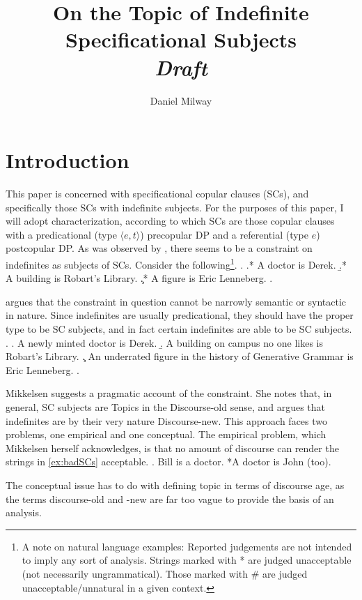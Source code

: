 \documentclass[letterpaper]{article}
\title{On the Topic of Indefinite Specificational Subjects\\\textit{Draft}}
\author{Daniel Milway}
\begin{document}
\maketitle
\section{Introduction}
This paper is concerned with specificational copular clauses (SCs), and specifically those SCs with indefinite subjects.
For the purposes of this paper, I will adopt  characterization, according to which SCs are those copular clauses with a predicational (type $\langle e,t\rangle$) precopular DP and a referential (type $e$) postcopular DP.
As was observed by \textcite{higgins1973pseudo}, there  seems to be a constraint on indefinites as subjects of SCs.
Consider the following\footnote{
	A note on natural language examples:
	Reported judgements are not intended to imply any sort of analysis.
	Strings marked with * are judged unacceptable (not necessarily ungrammatical).
	Those marked with \# are judged unacceptable/unnatural in a given context.
}.
\ex.\label{ex:badSCs}
\a.* A doctor is Derek.
\b.* A building is Robart's Library.
\c.* A figure is Eric Lenneberg. 
\z.

\textcite{mikkelsen2004specifying} argues that the constraint in question cannot be narrowly semantic or syntactic in nature.
Since indefinites are usually predicational, they should have the proper type to be SC subjects, and in fact certain indefinites are able to be SC subjects.
\ex.\label{ex:good-scs}
\a. A newly minted doctor is Derek.
\b. A building on campus no one likes is Robart's Library.
\c. An underrated figure in the history of Generative Grammar is Eric Lenneberg.
\z.

Mikkelsen suggests a pragmatic account of the constraint.
She notes that, in general, SC subjects are Topics in the Discourse-old sense, and argues that indefinites are by their very nature Discourse-new.
This approach faces two problems, one empirical and one conceptual.
The empirical problem, which Mikkelsen herself acknowledges, is that no amount of discourse can render the strings in \ref{ex:badSCs} acceptable.
\ex. Bill is a doctor. *A doctor is John (too). \hfill \parencite[Adapted from][p. 236]{mikkelsen2004specifying}

The conceptual issue has to do with defining topic in terms of discourse age, as the terms discourse-old and -new are far too vague to provide the basis of an analysis.
\end{document}
